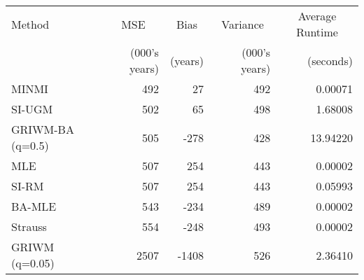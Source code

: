 
\begin{tabular}{lrrrr}
\toprule
\multicolumn{1}{l}{Method} & \multicolumn{1}{c}{MSE} & \multicolumn{1}{c}{Bias} & \multicolumn{1}{c}{Variance} & \multicolumn{1}{c}{Average Runtime} \\
 & (000's years) & (years) & (000's years) & (seconds)\\
\midrule
MINMI & 492 & 27 & 492 & 0.00071\\
SI-UGM & 502 & 65 & 498 & 1.68008\\
GRIWM-BA (q=0.5) & 505 & -278 & 428 & 13.94220\\
MLE & 507 & 254 & 443 & 0.00002\\
SI-RM & 507 & 254 & 443 & 0.05993\\
\addlinespace
BA-MLE & 543 & -234 & 489 & 0.00002\\
Strauss & 554 & -248 & 493 & 0.00002\\
GRIWM (q=0.05) & 2507 & -1408 & 526 & 2.36410\\
\bottomrule
\end{tabular}
